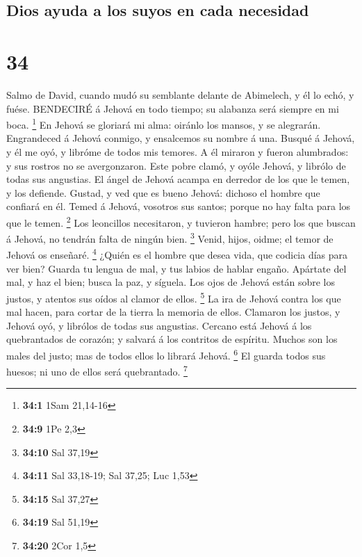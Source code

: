 \hypertarget{dios-ayuda-a-los-suyos-en-cada-necesidad}{%
\subsection{Dios ayuda a los suyos en cada
necesidad}\label{dios-ayuda-a-los-suyos-en-cada-necesidad}}

\hypertarget{section-33}{%
\section{34}\label{section-33}}

 Salmo de David, cuando mudó su semblante delante de
Abimelech, y él lo echó, y fuése. BENDECIRÉ á Jehová en todo tiempo; su
alabanza será siempre en mi boca. \footnote{\textbf{34:1} 1Sam 21,14-16}
 En Jehová se gloriará mi alma: oiránlo los mansos, y se
alegrarán.  Engrandeced á Jehová conmigo, y ensalcemos su
nombre á una.  Busqué á Jehová, y él me oyó, y libróme de
todos mis temores.  A él miraron y fueron alumbrados: y sus
rostros no se avergonzaron.  Este pobre clamó, y oyóle
Jehová, y librólo de todas sus angustias.  El ángel de
Jehová acampa en derredor de los que le temen, y los defiende.
 Gustad, y ved que es bueno Jehová: dichoso el hombre que
confiará en él.  Temed á Jehová, vosotros sus santos; porque
no hay falta para los que le temen. \footnote{\textbf{34:9} 1Pe 2,3}
 Los leoncillos necesitaron, y tuvieron hambre; pero los
que buscan á Jehová, no tendrán falta de ningún bien. \footnote{\textbf{34:10}
  Sal 37,19}  Venid, hijos, oidme; el temor de Jehová os
enseñaré. \footnote{\textbf{34:11} Sal 33,18-19; Sal 37,25; Luc 1,53}
 ¿Quién es el hombre que desea vida, que codicia días para
ver bien?  Guarda tu lengua de mal, y tus labios de hablar
engaño.  Apártate del mal, y haz el bien; busca la paz, y
síguela.  Los ojos de Jehová están sobre los justos, y
atentos sus oídos al clamor de ellos. \footnote{\textbf{34:15} Sal 37,27}
 La ira de Jehová contra los que mal hacen, para cortar de
la tierra la memoria de ellos.  Clamaron los justos, y
Jehová oyó, y librólos de todas sus angustias.  Cercano
está Jehová á los quebrantados de corazón; y salvará á los contritos de
espíritu.  Muchos son los males del justo; mas de todos
ellos lo librará Jehová. \footnote{\textbf{34:19} Sal 51,19}
 El guarda todos sus huesos; ni uno de ellos será
quebrantado. \footnote{\textbf{34:20} 2Cor 1,5}

